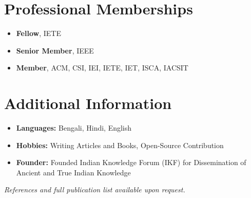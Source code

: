 \documentclass[10pt,a4paper]{article}
\begin{document}
	\section*{Professional Memberships}
	
	\begin{itemize}[leftmargin=0.15in]
		\item \textbf{Fellow}, IETE
		\item \textbf{Senior Member}, IEEE
		\item \textbf{Member}, ACM, CSI, IEI, IETE, IET, ISCA, IACSIT
	\end{itemize}
	
	\section*{Additional Information}
	
	\begin{itemize}[leftmargin=0.15in]
		\item \textbf{Languages:} Bengali, Hindi, English
		\item \textbf{Hobbies:} Writing Articles and Books, Open-Source Contribution
		\item \textbf{Founder:} Founded Indian Knowledge Forum (IKF) for Dissemination of Ancient and True Indian Knowledge
	\end{itemize}
	
	\vfill
	
	\begin{center}
		\textit{References and full publication list available upon request.}
	\end{center}
	
\end{document}
